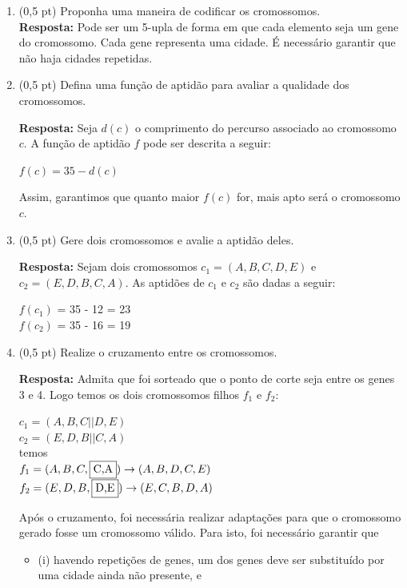 \documentclass[12pt,a4paper,oneside]{article}
\begin{document}
\begin{enumerate}
	\begin{enumerate}
		\item (0,5 pt) Proponha uma maneira de codificar os cromossomos.\\
		{\color{blue} {\bf Resposta:} Pode ser um 5-upla de forma em que cada elemento seja um gene do cromossomo. Cada gene representa uma cidade. É necessário garantir que não haja cidades repetidas.}
		\item (0,5 pt) Defina uma função de aptidão para avaliar a qualidade dos cromossomos.\\
		{\color{blue} {\bf Resposta:} Seja $d(c)$ o comprimento do percurso associado ao cromossomo $c$. A função de aptidão $f$ pode ser descrita a seguir:
			\begin{center}
				$f(c) = 35 - d(c)$
			\end{center}
			Assim, garantimos que quanto maior $f(c)$ for, mais apto será o cromossomo $c$.}
		\item (0,5 pt) Gere dois cromossomos e avalie a aptidão deles.\\
		{\color{blue} {\bf Resposta:} Sejam dois cromossomos $c_1 = (A,B,C,D,E)$ e $c_2 = (E,D,B,C,A)$. As aptidões de $c_1$ e $c_2$ são dadas a seguir:
			\begin{center}
				$f(c_1)$ 	= 35 - 12 = 23\\
				$f(c_2)$ 	= 35 - 16 = 19
		\end{center}}
		\item (0,5 pt) Realize o cruzamento entre os cromossomos.\\
		{\color{blue} {\bf Resposta:} Admita que foi sorteado que o ponto de corte seja entre os genes 3 e 4. Logo temos os dois cromossomos filhos $f_1$ e $f_2$:
			\begin{center}
				$c_1 = (A,B,C||D,E)$\\
				$c_2 = (E,D,B||C,A)$\\
				temos\\
				$f_1 = (A,B,C,\fbox{C,A}) \rightarrow (A,B,D,C,E)$\\
				$f_2 = (E,D,B,\fbox{D,E}) \rightarrow (E,C,B,D,A)$\\
			\end{center}
			Após o cruzamento, foi necessária realizar adaptações para que o cromossomo gerado fosse um cromossomo válido. Para isto, foi necessário garantir que 
			\begin{itemize}
				\item[] (i) havendo repetições de genes, um dos genes deve ser substituído por uma cidade ainda não presente, e

\end{itemize}}
\end{enumerate}
\end{enumerate}
\end{document}
